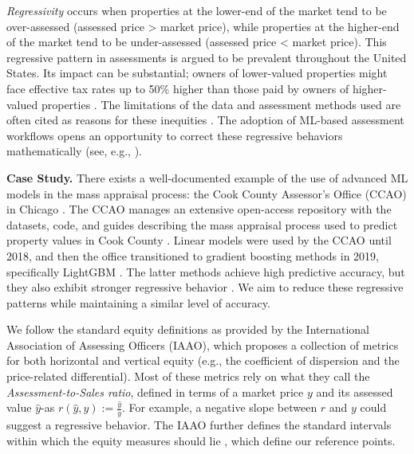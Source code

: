 \documentclass[11pt]{article}
\theoremstyle{plain}
\theoremstyle{definition}
\newcommand{\1}{\mathbf{1}}
\begin{document}
\textit{Regressivity} occurs when properties at the lower-end of the market tend to be over-assessed (assessed price > market price), while properties at the higher-end of the market tend to be under-assessed (assessed price < market price). This regressive pattern in assessments is argued to be prevalent throughout the United States. Its impact can be substantial; owners of
lower-valued properties might face effective tax rates up to 50\% higher than those paid by owners of
higher-valued properties \cite{amornsiripanitch2020why}. The limitations of the data and assessment methods used are often cited as reasons for these inequities \cite{Berry2021}. The adoption of ML-based assessment workflows opens an opportunity to correct these regressive behaviors mathematically (see, e.g., \textcite{candogan2023achieving}).



\textbf{Case Study.} 
There exists a well-documented example of the use of advanced ML models in the mass appraisal process: the Cook County Assessor's Office (CCAO) in Chicago \cite{ccao_how_properties_are_valued}. The CCAO manages an extensive open-access repository with the datasets, code, and guides describing the mass appraisal process used to predict property values in Cook County \cite{ccao_data_2026}. Linear models were used by the CCAO until 2018, and then the office transitioned to gradient boosting methods in 2019, specifically LightGBM \cite{lightgbm}. The latter methods achieve high predictive accuracy, but they also exhibit stronger regressive behavior \cite{candogan2023achieving}. We aim to reduce these regressive patterns while maintaining a similar level of accuracy. 


We follow the standard equity definitions as provided by the International Association of Assessing Officers (IAAO), which proposes a collection of metrics for both horizontal and vertical equity \cite{iaao2025ratio} (e.g., the coefficient of dispersion and the price-related differential). Most of these metrics rely on what they call the \textit{Assessment-to-Sales ratio}, defined in terms of a market price $y$ and its assessed value $\hat{y}${\color{white}-}as
$r(\hat{y}, y):= \frac{\hat{y}}{y}$. For example, a negative slope between $r$ and $y$ could suggest a regressive behavior. The IAAO further defines the standard intervals within which the equity measures should lie \cite{iaao2025ratio}, which define our reference points. 
\end{document}
